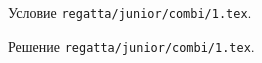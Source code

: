 \problem
Условие \texttt{regatta/junior/combi/1.tex}.

\solution Решение \texttt{regatta/junior/combi/1.tex}.
\endproblem
